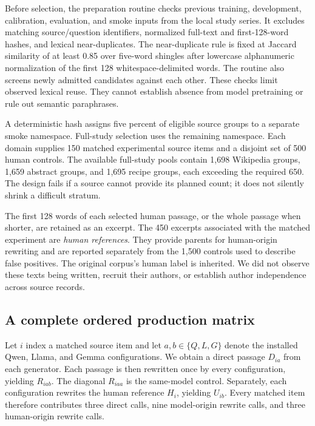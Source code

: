 Before selection, the preparation routine checks previous training, development, calibration, evaluation, and smoke inputs from the local study series. It excludes matching source/question identifiers, normalized full-text and first-128-word hashes, and lexical near-duplicates. The near-duplicate rule is fixed at Jaccard similarity of at least 0.85 over five-word shingles after lowercase alphanumeric normalization of the first 128 whitespace-delimited words. The routine also screens newly admitted candidates against each other. These checks limit observed lexical reuse. They cannot establish absence from model pretraining or rule out semantic paraphrases.

A deterministic hash assigns five percent of eligible source groups to a separate smoke namespace. Full-study selection uses the remaining namespace. Each domain supplies 150 matched experimental source items and a disjoint set of 500 human controls. The available full-study pools contain 1,698 Wikipedia groups, 1,659 abstract groups, and 1,695 recipe groups, each exceeding the required 650. The design fails if a source cannot provide its planned count; it does not silently shrink a difficult stratum.

The first 128 words of each selected human passage, or the whole passage when shorter, are retained as an excerpt. The 450 excerpts associated with the matched experiment are \emph{human references}. They provide parents for human-origin rewriting and are reported separately from the 1,500 controls used to describe false positives. The original corpus's human label is inherited. We did not observe these texts being written, recruit their authors, or establish author independence across source records.

\subsection{A complete ordered production matrix}
Let $i$ index a matched source item and let $a,b\in\{Q,L,G\}$ denote the installed Qwen, Llama, and Gemma configurations. We obtain a direct passage $D_{ia}$ from each generator. Each passage is then rewritten once by every configuration, yielding $R_{iab}$. The diagonal $R_{iaa}$ is the same-model control. Separately, each configuration rewrites the human reference $H_i$, yielding $U_{ib}$. Every matched item therefore contributes three direct calls, nine model-origin rewrite calls, and three human-origin rewrite calls.

